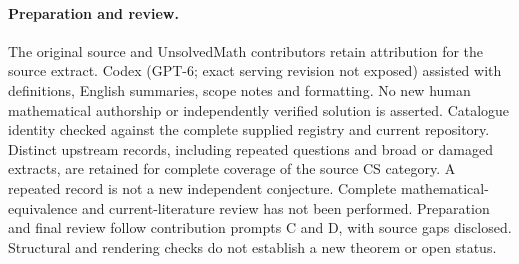 \documentclass[11pt]{article}
\begin{document}
\paragraph{Preparation and review.}
The original source and UnsolvedMath contributors retain attribution for the source extract. Codex (GPT-6; exact serving revision not exposed) assisted with definitions, English summaries, scope notes and formatting. No new human mathematical authorship or independently verified solution is asserted. Catalogue identity checked against the complete supplied registry and current repository. Distinct upstream records, including repeated questions and broad or damaged extracts, are retained for complete coverage of the source CS category. A repeated record is not a new independent conjecture. Complete mathematical-equivalence and current-literature review has not been performed. Preparation and final review follow contribution prompts C and D, with source gaps disclosed. Structural and rendering checks do not establish a new theorem or open status.
\label{end:statement}
\end{document}
